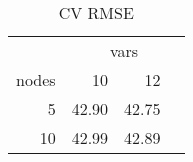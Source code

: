 \begin{table}

\caption{\label{tab:unnamed-chunk-11}CV RMSE}
\centering
\begin{tabular}[t]{r|r|r}
\hline
\multicolumn{1}{c|}{ } & \multicolumn{3}{c}{vars} \\
\cline{2-4}
nodes & 10 & 12\\
\hline
5 & 42.90 & 42.75\\
\hline
10 & 42.99 & 42.89\\
\hline
\end{tabular}
\end{table}